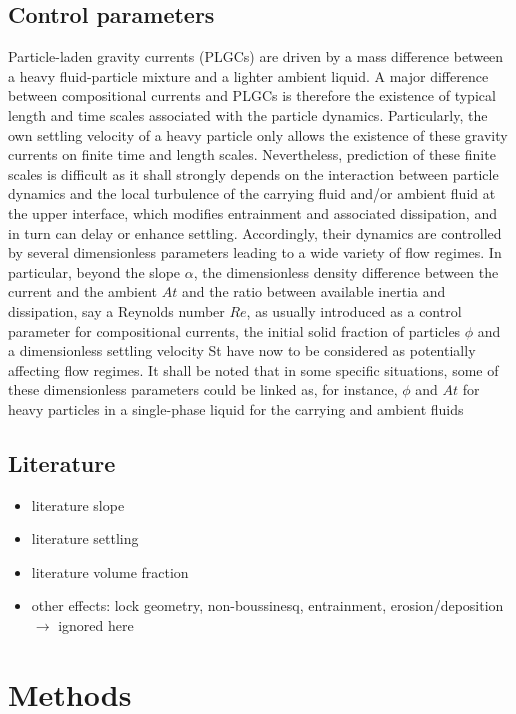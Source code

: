 \documentclass[twocolumn]{article}
\begin{document}
\subsection{Control parameters}

Particle-laden gravity currents (PLGCs) are driven by a mass difference between a heavy fluid-particle mixture and a lighter ambient liquid. A major difference between compositional currents and PLGCs is therefore the existence of typical length and time scales associated with the particle dynamics. Particularly, the own settling velocity of a heavy particle only allows the existence of these gravity currents on finite time and length scales. Nevertheless, prediction of these finite scales is difficult as it shall strongly depends on the interaction between particle dynamics and the local turbulence of the carrying fluid and/or ambient fluid at the upper interface, which modifies entrainment and associated dissipation, and in turn can delay or enhance settling. Accordingly, their dynamics are controlled by several dimensionless parameters leading to a wide variety of flow regimes. In particular, beyond the slope $\alpha$, the dimensionless density difference between the current and the ambient $At$ and the ratio between available inertia and dissipation, say a Reynolds number $Re$, as usually introduced as a control parameter for compositional currents, the initial solid fraction of particles $\phi$ and a dimensionless settling velocity St have now to be considered as potentially affecting flow regimes. It shall be noted that in some specific situations, some of these dimensionless parameters could be linked as, for instance, $\phi$ and $At$ for heavy particles in a single-phase liquid for the carrying and ambient fluids

\subsection{Literature}


\begin{itemize}
	\item literature slope
	\item literature settling
	\item literature volume fraction
	\item other effects: lock geometry, non-boussinesq, entrainment, erosion/deposition $\rightarrow$ ignored here
\end{itemize}

\section*{Methods}
\end{document}
